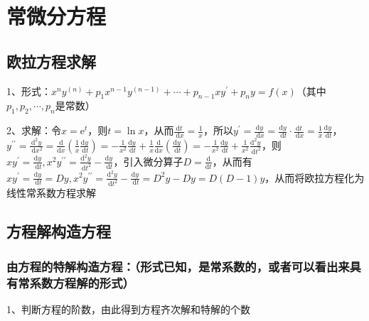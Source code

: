 \chapter{常微分方程}

\section{欧拉方程求解}

1、形式：$x^{n} y^{(n)}+p_{1} x^{n-1} y^{(n-1)}+\cdots+p_{n-1} x y^{\prime}+p_{n} y=f(x)$（其中$p_{1}, p_{2}, \cdots, p_{n}$是常数）

2、求解：令$x=\mathrm{e}^{t}$，则$t=\ln x$，从而$\frac{\mathrm{d} t}{\mathrm{~d} x}=\frac{1}{x}$，所以$y^{\prime} =\frac{\mathrm{d} y}{\mathrm{~d} x}=\frac{\mathrm{d} y}{\mathrm{~d} t} \cdot \frac{\mathrm{d} t}{\mathrm{~d} x}=\frac{1}{x} \frac{\mathrm{d} y}{\mathrm{~d} t}$，$y^{\prime \prime} =\frac{\mathrm{d}^{2} y}{\mathrm{~d} x^{2}}=\frac{\mathrm{d}}{\mathrm{d} x}\left(\frac{1}{x} \frac{\mathrm{d} y}{\mathrm{~d} t}\right)=-\frac{1}{x^{2}} \frac{\mathrm{d} y}{\mathrm{~d} t}+\frac{1}{x} \frac{\mathrm{d}}{\mathrm{d} x}\left(\frac{\mathrm{d} y}{\mathrm{~d} t}\right) =-\frac{1}{x^{2}} \frac{\mathrm{d} y}{\mathrm{~d} t}+\frac{1}{x^{2}} \frac{\mathrm{d}^{2} y}{\mathrm{~d} t^{2}}$，则$x y^{\prime}=\frac{\mathrm{d} y}{\mathrm{~d} t}, x^{2} y^{\prime \prime}=\frac{\mathrm{d}^{2} y}{\mathrm{~d} t^{2}}-\frac{\mathrm{d} y}{\mathrm{~d} t}$，引入微分算子$D=\frac{\mathrm{d}}{\mathrm{d} t}$，从而有$x y^{\prime}=\frac{\mathrm{d} y}{\mathrm{~d} t}=D y, x^{2} y^{\prime \prime}=\frac{\mathrm{d}^{2} y}{\mathrm{~d} t^{2}}-\frac{\mathrm{d} y}{\mathrm{~d} t}=D^{2} y-D y=D(D-1) y$，从而将欧拉方程化为线性常系数方程求解

\section{方程解构造方程}



\subsection{由方程的特解构造方程：（形式已知，是常系数的，或者可以看出来具有常系数方程解的形式）}

1、判断方程的阶数，由此得到方程齐次解和特解的个数

